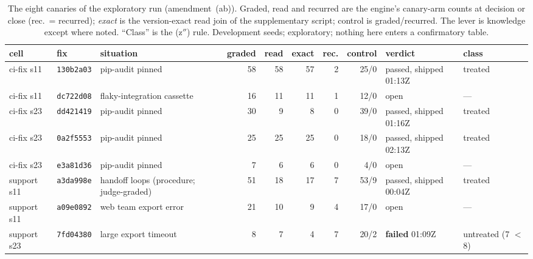 \documentclass[11pt]{article}
\newcommand{\code}[1]{\texttt{#1}}
\begin{document}
\begin{table}[t]
\centering\scriptsize
\caption{The eight canaries of the exploratory run (amendment~(ab)). Graded, read and recurred
are the engine's canary-arm counts at decision or close (rec.\ = recurred); \emph{exact} is the
version-exact read join of the supplementary script; control is graded/recurred. The lever is
knowledge except where noted. ``Class'' is the (z$''$) rule. Development seeds; exploratory;
nothing here enters a confirmatory table.}
\label{tab:exploratory-canaries}
\setlength{\tabcolsep}{4pt}
\begin{tabular}{@{}llp{2.6cm}rrrrrp{2.2cm}l@{}}
\toprule
cell & fix & situation & graded & read & exact & rec. & control & verdict & class\\
\midrule
ci-fix s11 & \code{130b2a03} & pip-audit pinned & 58 & 58 & 57 & 2 & 25/0 & passed, shipped 01:13Z & treated\\
ci-fix s11 & \code{dc722d08} & flaky-integration cassette & 16 & 11 & 11 & 1 & 12/0 & open & ---\\
ci-fix s23 & \code{dd421419} & pip-audit pinned & 30 & 9 & 8 & 0 & 39/0 & passed, shipped 01:16Z & treated\\
ci-fix s23 & \code{0a2f5553} & pip-audit pinned & 25 & 25 & 25 & 0 & 18/0 & passed, shipped 02:13Z & treated\\
ci-fix s23 & \code{e3a81d36} & pip-audit pinned & 7 & 6 & 6 & 0 & 4/0 & open & ---\\
support s11 & \code{a3da998e} & handoff loops (procedure; judge-graded) & 51 & 18 & 17 & 7 & 53/9 & passed, shipped 00:04Z & treated\\
support s11 & \code{a09e0892} & web team export error & 21 & 10 & 9 & 4 & 17/0 & open & ---\\
support s23 & \code{7fd04380} & large export timeout & 8 & 7 & 4 & 7 & 20/2 & \textbf{failed} 01:09Z & untreated (7 $<$ 8)\\
\bottomrule
\end{tabular}
\end{table}
\end{document}
